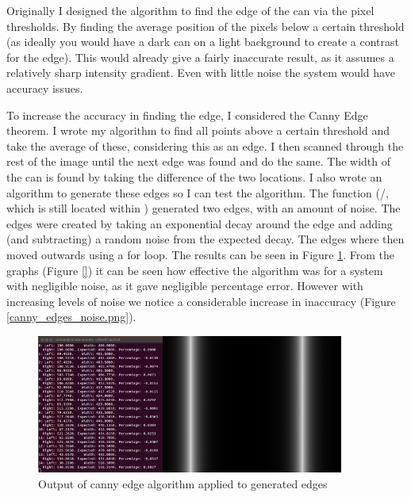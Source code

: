 Originally I designed the algorithm to find the edge of the can via the pixel thresholds.  By finding the average position of the pixels below a certain threshold (as ideally you would have a dark can on a light background to create a contrast for the edge). This would already give a fairly inaccurate result, as it assumes a relatively sharp intensity gradient.  Even with little noise the system would have accuracy issues.

To increase the accuracy in finding the edge, I considered the Canny Edge theorem.  I wrote my algorithm to find all points above a certain threshold and take the average of these, considering this as an edge.  I then scanned through the rest of the image until the next edge was found and do the same.  The width of the can is found by taking the difference of the two locations.  I also wrote an algorithm to generate these edges so I can test the algorithm.  The function (/, which is still located within ) generated two edges, with an amount of noise.  The edges were created by taking an exponential decay around the edge and adding (and subtracting) a random noise from the expected decay.  The edges where then moved outwards using a for loop. The results can be seen in Figure \ref{canny_edges.png}. From the graphs (Figure \ref{}) it can be seen how effective the algorithm was for a system with negligible noise, as it gave negligible percentage error.  However with increasing levels of noise we notice a considerable increase in inaccuracy (Figure \ref{canny_edges_noise.png}).  



\begin{figure}[H]
	\centering
	\includegraphics[width=0.9\textwidth]{figures/canny_edges.png}
	\caption{Output of canny edge algorithm applied to generated edges} 
	\label{canny_edges.png}
\end{figure}

